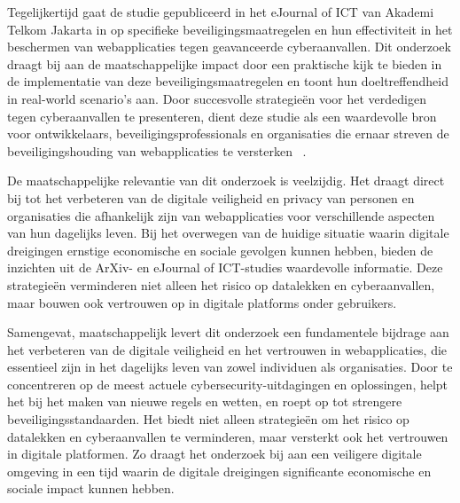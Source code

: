 Tegelijkertijd gaat de studie gepubliceerd in het eJournal of ICT van Akademi Telkom Jakarta in op specifieke beveiligingsmaatregelen en hun effectiviteit in 
het beschermen van webapplicaties tegen geavanceerde cyberaanvallen. Dit onderzoek draagt bij aan de maatschappelijke impact door een praktische kijk te 
bieden in de implementatie van deze beveiligingsmaatregelen en toont hun doeltreffendheid in real-world scenario's aan. Door succesvolle strategieën voor het 
verdedigen tegen cyberaanvallen te presenteren, dient deze studie als een waardevolle bron voor ontwikkelaars, beveiligingsprofessionals en organisaties
die ernaar streven de beveiligingshouding van webapplicaties te versterken ~\autocite{OlivianaZabka2023}.

De maatschappelijke relevantie van dit onderzoek is veelzijdig. Het draagt direct bij tot het verbeteren van de digitale veiligheid en privacy van personen 
en organisaties die afhankelijk zijn van webapplicaties voor verschillende aspecten van hun dagelijks leven. Bij het overwegen van de huidige situatie waarin 
digitale dreigingen ernstige economische en sociale gevolgen kunnen hebben, bieden de inzichten uit de ArXiv- en eJournal of ICT-studies waardevolle informatie. Deze strategieën 
verminderen niet alleen het risico op datalekken en cyberaanvallen, maar bouwen ook vertrouwen op in digitale platforms onder gebruikers.

Samengevat, maatschappelijk levert dit onderzoek een fundamentele bijdrage aan het verbeteren van de digitale veiligheid en het vertrouwen in webapplicaties, die essentieel 
zijn in het dagelijks leven van zowel individuen als organisaties. Door te concentreren op de meest actuele cybersecurity-uitdagingen en oplossingen, 
helpt het bij het maken van nieuwe regels en wetten, en roept op tot strengere beveiligingsstandaarden. Het biedt niet alleen strategieën om het risico 
op datalekken en cyberaanvallen te verminderen, maar versterkt ook het vertrouwen in digitale platformen. Zo draagt het onderzoek bij aan een veiligere 
digitale omgeving in een tijd waarin de digitale dreigingen significante economische en sociale impact kunnen hebben.


